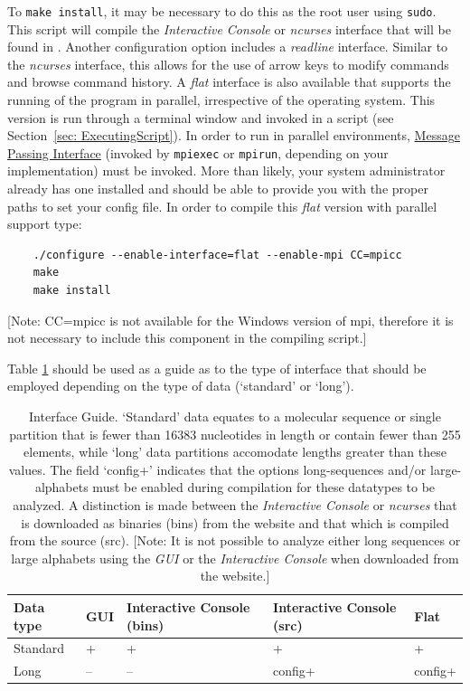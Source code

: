 To \texttt{make install}, it may be necessary to do this as the root user using \texttt{sudo}.
 This script will compile the \emph{Interactive Console} or \emph{ncurses} interface that will be found in 
.
Another configuration option includes a \emph{readline} interface.  Similar to the \emph{ncurses} interface, 
this allows for the use of arrow keys to modify commands and browse command history.  %
A \emph{flat} interface is also available that supports the running of the program in parallel, irrespective of 
the operating system. This version is run through a terminal window and invoked in a script (see Section~\ref{sec: ExecutingScript}). 
In order to run \poy in parallel environments, \href{http://www-unix.mcs.anl.gov/mpi/}{Message Passing Interface} 
(invoked by \texttt{mpiexec} or \texttt{mpirun}, depending on your implementation) must be invoked. 
More than likely, your system administrator already has one installed and should be able to provide you with the 
proper paths to set your config file. In order to compile this \emph{flat} version with parallel support type: 
	\begin{verbatim}
	./configure --enable-interface=flat --enable-mpi CC=mpicc
	make
	make install
	\end{verbatim}
[Note: CC=mpicc is not available for the Windows version of mpi, therefore it is not necessary to include this 
component in the compiling script.] 

Table \ref{InterfaceGuide} should be used as a guide as to the type of interface that should be 
employed depending on the type of data (`standard' or `long').

\begin{table}[th!]
\small
\caption{Interface Guide. `Standard' data equates to a molecular sequence or single partition that is fewer than 16383 
nucleotides in length or contain fewer than 255 elements, while `long' data partitions accomodate lengths greater than these values. The field 
`config+' indicates that the options long-sequences and/or large-alphabets must be enabled during compilation for these 
datatypes to be analyzed. A distinction is made between the \emph{Interactive Console} or \emph{ncurses} that is downloaded as binaries 
(bins) from the website and that which is compiled from the source (src). [Note: It is not possible to analyze either long sequences or
large alphabets using the \emph{GUI} or the \emph{Interactive Console} when downloaded from the \poy website.]}
\label{InterfaceGuide} 
\begin{center}
\renewcommand{\arraystretch}{1.5}
\begin{tabular}{p{2.0cm}  p{0.75cm}  p{3.0cm}  p{3.0cm}  p{1.0cm}} 
\hline
	Data type & GUI & Interactive Console (bins) & Interactive Console (src) & Flat \\
\hline
	Standard & + & + & + & + \\
	Long & -- & -- & config+ & config+\\
\hline
\end{tabular}
\end{center}
\end{table}

